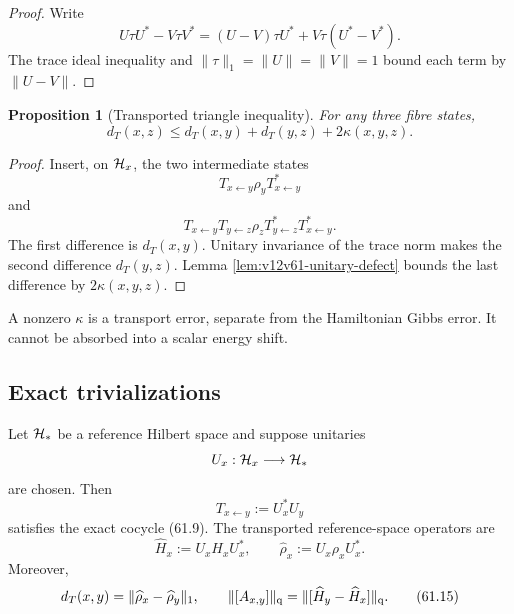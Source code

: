 \documentclass[11pt]{article}
\newtheorem{proposition}[theorem]{Proposition}
\theoremstyle{remark}
\begin{document}
\begin{proof}
Write
\[
 U\tau U^*-V\tau V^*
 =
 (U-V)\tau U^*+V\tau(U^*-V^*).
\]
The trace ideal inequality and
\(\|\tau\|_1=\|U\|=\|V\|=1\) bound each term by
\(\|U-V\|\).
\end{proof}

\begin{proposition}[Transported triangle inequality]
\label{prop:v12v61-triangle}
For any three fibre states,
\begin{equation}
 d_T(x,z)
 \leq
 d_T(x,y)+d_T(y,z)+2\kappa(x,y,z).                \tag{61.12}
\end{equation}
\end{proposition}

\begin{proof}
Insert, on \({\cal H}_x\), the two intermediate states
\[
 T_{x\leftarrow y}\rho_yT_{x\leftarrow y}^*
\]
and
\[
 T_{x\leftarrow y}T_{y\leftarrow z}\rho_z
 T_{y\leftarrow z}^*T_{x\leftarrow y}^*.
\]
The first difference is \(d_T(x,y)\).  Unitary invariance of the
trace norm makes the second difference \(d_T(y,z)\).  Lemma
\ref{lem:v12v61-unitary-defect} bounds the last difference by
\(2\kappa(x,y,z)\).
\end{proof}

A nonzero \(\kappa\) is a transport error, separate from the
Hamiltonian Gibbs error.  It cannot be absorbed into a scalar energy
shift.

\subsection{Exact trivializations}

Let \({\cal H}_*\) be a reference Hilbert space and suppose unitaries
\[
 U_x:{\cal H}_x\longrightarrow{\cal H}_*
\]
are chosen.  Then
\begin{equation}
 T_{x\leftarrow y}:=U_x^*U_y                     \tag{61.13}
\end{equation}
satisfies the exact cocycle (61.9).  The transported reference-space
operators are
\begin{equation}
 \widehat H_x:=U_xH_xU_x^*,\qquad
 \widehat\rho_x:=U_x\rho_xU_x^*.                  \tag{61.14}
\end{equation}
Moreover,
\begin{equation}
 d_T(x,y)=\|\widehat\rho_x-\widehat\rho_y\|_1,
 \qquad
 \|[A_{x,y}]\|_{\rm q}
 =
 \|[\widehat H_y-\widehat H_x]\|_{\rm q}.          \tag{61.15}
\end{equation}
\end{document}
